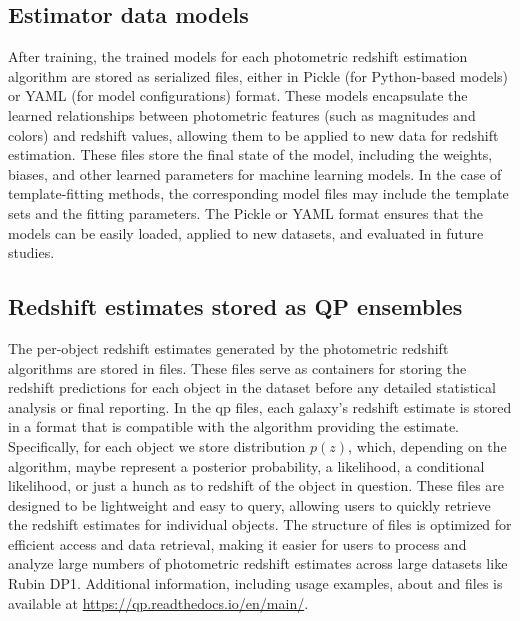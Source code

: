 \subsection{Estimator data models}
\label{sec:products:models}

After training, the trained models for each photometric redshift estimation algorithm are stored as serialized files, either in Pickle (for Python-based models) or YAML (for model configurations) format.  These models encapsulate the learned relationships between photometric features (such as magnitudes and colors) and redshift values, allowing them to be applied to new data for redshift estimation.  These files store the final state of the model, including the weights, biases, and other learned parameters for machine learning models.  In the case of template-fitting methods, the corresponding model files may include the template sets and the fitting parameters.  The Pickle or YAML format ensures that the models can be easily loaded, applied to new datasets, and evaluated in future studies.


\subsection{Redshift estimates stored as QP ensembles}
\label{sec:products:qp_ensembles}

The per-object redshift estimates generated by the photometric redshift algorithms are stored in  files.  These files serve as containers for storing the redshift predictions for each object in the dataset before any detailed statistical analysis or final reporting.  In the qp files, each galaxy’s redshift estimate is stored in a format that is compatible with the algorithm providing the estimate.   Specifically, for each object we store distribution $p(z)$, which, depending on the algorithm, maybe represent a posterior probability, a likelihood, a conditional likelihood, or just a hunch as to redshift of the object in question.   These  files are designed to be lightweight and easy to query, allowing users to quickly retrieve the redshift estimates for individual objects.  The structure of  files is optimized for efficient access and data retrieval, making it easier for users to process and analyze large numbers of photometric redshift estimates across large datasets like Rubin DP1.  Additional information, including usage examples, about  and  files is available at \href{https://qp.readthedocs.io/en/main/}{https://qp.readthedocs.io/en/main/}.


